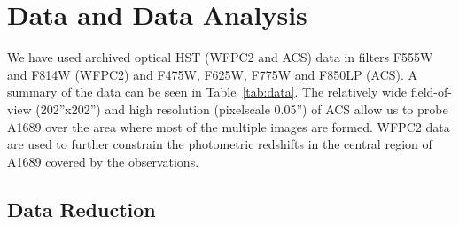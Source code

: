 \documentclass[useAMS,usenatbib]{mn2e}
\begin{document}

\section{Data and Data Analysis}
\label{sec:data}
We have used archived optical HST (WFPC2 and ACS) data in filters
F555W and F814W (WFPC2) and F475W, F625W, F775W and F850LP (ACS). A
summary of the data can be seen in Table~\ref{tab:data}. The
relatively wide field-of-view (202''x202'') and high resolution
(pixelscale 0.05'') of ACS allow us to probe A1689 over the area where
most of the multiple images are formed. WFPC2 data are used to further
constrain the photometric redshifts in the central region of A1689
covered by the observations.



\subsection{Data Reduction}


\end{document}
